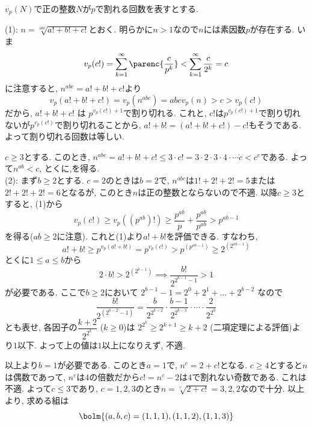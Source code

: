 $v_p(N)$で正の整数$N$が$p$で割れる回数を表すとする.

(1): $n=\sqrt[abc]{a!+b!+c!}$とおく. 明らかに$n>1$なので$n$には素因数$p$が存在する. いま
\[
v_p(c!) = \sum_{k=1}^{\infty} \parenc{\dfrac{c}{p^k}} < \sum_{k=1}^{\infty} \dfrac{c}{2^k} = c
\]
に注意すると, $n^{abc} = a!+b!+c!$より
\[v_p(a! + b! + c!) = v_p(n^{abc}) = abc v_p(n) > c > v_p(c!)
\]
だから, $a! + b! + c!$ は $p^{v_p(c!) + 1}$で割り切れる. これと,  $c!$は$p^{v_p(c!) + 1}$で割り切れないが$p^{v_p(c!)}$で割り切れることから, $a! + b! = (a! + b! + c!) - c!$もそうである. よって割り切れる回数は等しい. \par
$c\geq 3$とする. このとき, $n^{abc} = a! + b! + c! \leq 3\cdot c! = 3\cdot 2\cdot 3\cdot 4\cdot \cdots \dot c < c^{c}$である. よって$n^{ab} < c$, とくに,を得る. \\
(2): まず$b\geq 2$とする. $c=2$のときは$b=2$で, $n^{abc}$は$1! + 2! + 2! = 5$または$2!+2!+2! = 6$となるが, このとき$n$は正の整数とならないので不適. 以降$c\geq 3$とすると, (1)から
\[
v_p(c!) \geq v_p((p^{ab})!) \geq \dfrac{p^{ab}}{p} + \dfrac{p^{ab}}{p^{ab}} > p^{ab-1}
\]
を得る($ab\geq 2$に注意). これと(1)より$a! + b!$を評価できる. すなわち,
\[
a! + b! \geq p^{v_p(a!+b!)} = p^{v_p(c!)} > p^{(p^{ab-1})} \geq 2^{(2^{ab-1})}
\]
とくに$1\leq a\leq b$から
\[
2\cdot b! > 2^{(2^{b-1})} \implies \dfrac{b!}{2^{2^{b-1} - 1}} > 1
\]
が必要である. ここで$b\geq 2$において $2^{b-1} - 1 = 2^0 + 2^1 + \dots + 2^{b-2}$ なので
\[
\dfrac{b!}{2^{(2^{b-2}-1)}} = \dfrac{b}{2^{2^{b-2}}} \cdot \dfrac{b-1}{2^{2^{b-3}}} \cdot \cdots \cdot \dfrac{2}{2^{2^0}}
\]
とも表せ, 各因子の$\dfrac{k+2}{2^{2^{k}}}$ ($k\geq 0$)は $2^{2^k} \geq 2^{k+1} \geq k+2$ (二項定理による評価)より$1$以下. よって上の値は$1$以上になりえず, 不適.

以上より$b=1$が必要である. このとき$a=1$で, $n^c = 2 + c!$となる. $c\geq 4$とすると$n$は偶数であって, $n^c$は$4$の倍数だから$c! = n^c - 2$は4で割れない奇数である. これは不適. よって$c\leq 3$であり, $c=1,2,3$のとき$n=\sqrt[c]{2+c!} = 3,2,2$なので十分. 以上より, 求める組は
\[
\bolm{(a,b,c) = (1,1,1), (1,1,2), (1,1,3)}
\]
